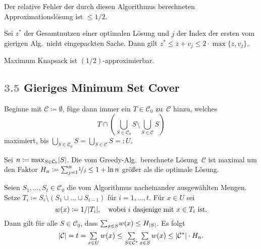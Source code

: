 \documentclass{cheat-sheet}
\newcommand{\size}[1]{\abs{#1}} %
\newcommand{\Problem}[1]{\textcolor{ProblemColor}{\textbf{#1}}}
\newcommand{\scriptSection}[1]{\textcolor{gray}{#1}\enspace}
\begin{document}
\begin{satz}
  Der relative Fehler der durch diesen Algorithmus berechneten Approximationslösung ist $\leq 1/2$.
\end{satz}

\begin{beweisskizze}
  Sei $z^*$ der Gesamtnutzen einer optimalen Lösung und $j$ der Index der ersten vom gierigen Alg.\ nicht eingepackten Sache.
  Dann gilt $z^* \leq z + v_j \leq 2 \cdot \max \{ z, v_j \}$.
\end{beweisskizze}

\begin{kor}
  Maximum Knapsack ist $(1/2)$-approximierbar.
\end{kor}

\subsection{\scriptSection{3.5} Gieriges \Problem{Minimum Set Cover}}

\begin{alg}
  Beginne mit $\mathcal{C} \coloneqq \emptyset$, füge dann immer ein $T \in \mathcal{C}_0$ zu~$\mathcal{C}$ hinzu, welches
  \[ T \cap \left( {\bigcup}_{S \in \mathcal{C}_0} S \setminus {\bigcup}_{S \in \mathcal{C}} S \right) \]
  maximiert, bis ${\bigcup}_{S \in \mathcal{C}_0} S = {\bigcup}_{S \in \mathcal{C}} S =: U$.
\end{alg}

\begin{satz}
  Sei $n \coloneqq {\max}_{S \in \mathcal{C}_0} \size{S}$.
  Die vom Greedy-Alg.\ berechnete Lösung~$\mathcal{C}$ ist maximal um den Faktor $H_n \coloneqq {\sum}_{j=1}^n \nicefrac{1}{j} \leq 1 + \ln n$ größer als die optimale Lösung.
\end{satz}

\begin{beweisskizze}
  Seien $S_1, \ldots, S_t \in \mathcal{C}_0$ die vom Algorithmus nacheinander ausgewählten Mengen.
  Setze $T_i \coloneqq S_i \setminus (S_1 \cup \ldots \cup S_{i-1})$ für $i = 1, \ldots, t$.
  Für $x \in U$ sei
  \[
    w(x) \coloneqq 1/\size{T_i}, \quad
    \text{wobei $i$ dasjenige mit $x \in T_i$ ist.}
  \]
  Dann gilt für alle $S \in \mathcal{C}_0$, dass ${\sum}_{x \in S} w(x) \leq H_{\size{S}}$.
  Es folgt
  \[
    \size{\mathcal{C}} = t = \sum_{x \in U} w(x) \leq \sum_{S \in \mathcal{C}^*} \sum_{x \in S} w(x) \leq \size{\mathcal{C}^*} \cdot H_n.
  \]
\end{beweisskizze}
\end{document}
